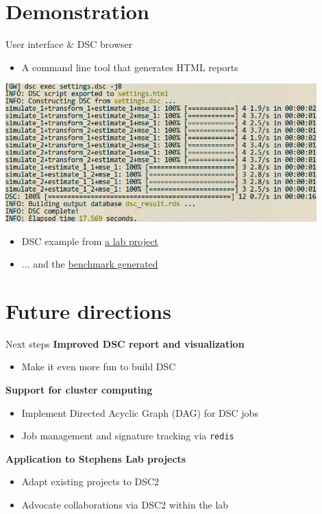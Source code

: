 \section{Demonstration}
\begin{frame}{User interface \& DSC browser}
\begin{itemize}
  \item A command line tool that generates HTML reports
\end{itemize}
  \centering \includegraphics[width=0.9\textwidth]{figs/dsc6}
\begin{itemize}
  \item DSC example from \href{http://www.bioinformatics.org/labnotes/dr-tree/dsc/20160630/benchmark.html}{a lab project}
  \item ... and the
    \href{http://www.bioinformatics.org/labnotes/dr-tree/figures/20160630/simulation-brownian-20160630.html}{benchmark generated}
\end{itemize}
\end{frame}
\section{Future directions}
\begin{frame}{Next steps}
  \textbf{Improved DSC report and visualization}
  \begin{itemize}
    \item Make it even more fun to build DSC
  \end{itemize}
  \textbf{Support for cluster computing}
  \begin{itemize}
    \item Implement Directed Acyclic Graph (DAG) for DSC jobs
    \item Job management and signature tracking via \texttt{redis}
  \end{itemize}
  \textbf{Application to Stephens Lab projects}
  \begin{itemize}
    \item Adapt existing projects to DSC2
    \item Advocate collaborations via DSC2 within the lab
  \end{itemize}
\end{frame}
